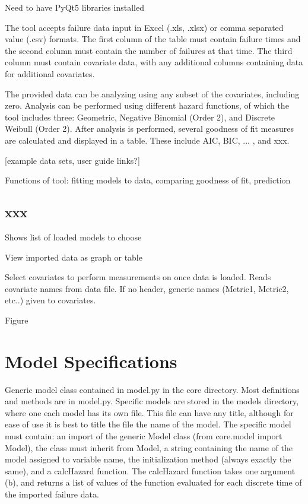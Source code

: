 \documentclass[conference]{IEEEtran}
\begin{document}
Need to have PyQt5 libraries installed

The tool accepts failure data input in Excel (.xls, .xlsx) or comma separated value (.csv) formats. The first column of the table must contain failure times and the second column must contain the number of failures at that time. The third column must contain covariate data, with any additional columns containing data for additional covariates.

The provided data can be analyzing using any subset of the covariates, including zero. Analysis can be performed using different hazard functions, of which the tool includes three: Geometric, Negative Binomial (Order 2), and Discrete Weibull (Order 2).
After analysis is performed, several goodness of fit measures are calculated and displayed in a table. These include AIC, BIC, ... , and xxx.

[example data sets, user guide links?]



Functions of tool: fitting models to data, comparing goodness of fit, prediction

\subsection{xxx}\label{sec:Tab1}
Shows list of loaded models to choose

View imported data as graph or table

Select covariates to perform measurements on once data is loaded. Reads covariate names from data file. If no header, generic names (Metric1, Metric2, etc..) given to covariates. 

Figure



\section{Model Specifications}\label{sec:Specs}
Generic model class contained in model.py in the core directory. Most definitions and methods are in model.py. Specific models are stored in the models directory, where one each model has its own file. This file can have any title, although for ease of use it is best to title the file the name of the model. The specific model must contain: an import of the generic Model class (from core.model import Model), the class must inherit from Model, a string containing the name of the model assigned to variable name, the initialization method (always exactly the same), and a calcHazard function. The calcHazard function takes one argument (b), and returns a list of values of the function evaluated for each discrete time of the imported failure data. 
\end{document}
